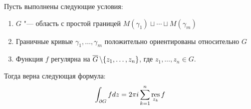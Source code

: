 \begin{theorem}
	Пусть выполнены следующие условия:
	\begin{enumerate}
		\item $G$ "--- область с простой границей $M(\gamma_1) \sqcup \dotsb \sqcup M(\gamma_m)$
		
		\item Граничные кривые $\gamma_1, \dotsc, \gamma_m$ положительно ориентированы относительно $G$
		
		\item Функция $f$ регулярна на $\overline{G}\,\backslash \{z_1, \dotsc, z_n\}$, где $z_1, \dotsc, z_n \in G$.
	\end{enumerate}
	
	Тогда верна следующая формула:
	\[\int_{\partial G}fdz = 2\pi i\sum_{k = 1}^n\operatorname*{res}_{z_k}f\]
\end{theorem}

